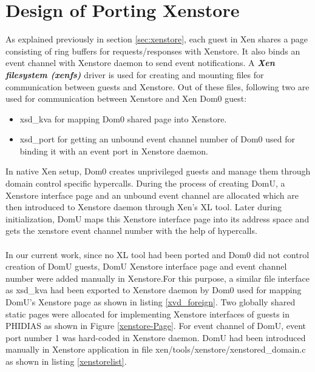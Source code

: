 \section{Design of Porting Xenstore\label{sec:xenstorestatic}}
As explained previously in section \ref{sec:xenstore}, each guest in Xen shares a page consisting of ring buffers for requests/responses with Xenstore. It also binds an event channel with Xenstore daemon to send event notifications. A \textbf{\textit{Xen filesystem (xenfs)}} driver is used for creating and mounting files for communication between guests and Xenstore. Out of these files, following two are used for communication between Xenstore and Xen Dom0 guest:
\begin{itemize}
	\item xsd\_kva for mapping Dom0 shared page into Xenstore.
	\item xsd\_port for getting an unbound event channel number of Dom0 used for binding it with an event port in Xenstore daemon. 
\end{itemize}
In native Xen setup, Dom0 creates unprivileged guests and manage them through domain control specific hypercalls. During the process of creating DomU, a Xenstore interface page and an unbound event channel are allocated which are then introduced to Xenstore daemon through Xen's XL tool. Later during initialization, DomU maps this Xenstore interface page into its address space and gets the xenstore event channel number with the help of hypercalls.
\\
\\
In our current work, since no XL tool had been ported and Dom0 did not control creation of DomU guests, DomU Xenstore interface page and event channel number were added manually in Xenstore.For this purpose, a similar file interface as xsd\_kva had been exported to Xenstore daemon by Dom0 used for mapping DomU's Xenstore page as shown in listing \ref{xvd_foreign}. Two globally shared static pages were allocated for implementing Xenstore interfaces of guests in PHIDIAS  as shown in Figure \ref{xenstore-Page}. For event channel of DomU, event port number 1 was hard-coded in Xenstore daemon. DomU had been introduced manually in Xenstore application in file xen/tools/xenstore/xenstored\_domain.c as shown in listing \ref{xenstorelist}.
\\
\\
